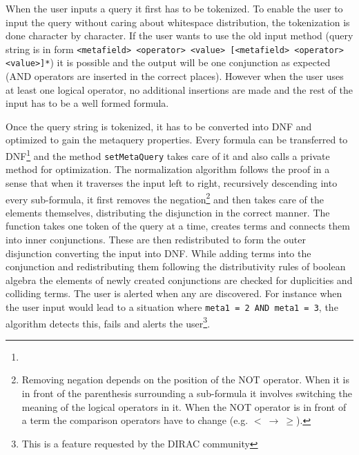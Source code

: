 
When the user inputs a query it first has to be tokenized. To enable the user to input the query without caring 
about whitespace distribution, the tokenization is done character by character.
If the user wants to use the old input method (query string is in form 
\texttt{<metafield> <operator> <value> [<metafield> <operator> <value>]*})
it is possible and the output will be one conjunction as expected (AND operators are inserted in the
correct places). However when the user uses at least one logical operator, no additional insertions are made
and the rest of the input has to be a well formed formula. 

Once the query string is tokenized, it has to be converted into DNF and optimized to gain the metaquery 
properties. Every formula can be transferred to DNF\footnote{} and %
the method \texttt{setMetaQuery} takes care of it and also calls a private method for optimization.
The normalization algorithm follows the proof in a sense that when it traverses the input left to right, 
recursively descending into every sub-formula, it first removes the negation\footnote{Removing negation depends on 
the position of the NOT operator. When it is in front of the parenthesis surrounding a sub-formula it involves 
switching the meaning of the logical operators in it. When the NOT operator is in front of a term the comparison 
operators have to change (e.g. $ < \: \rightarrow \: \geq$).} 
and then takes care of the elements themselves, distributing the disjunction in the correct manner. %
The function takes one token of the query at a time, creates terms and connects them into inner conjunctions. 
These are then redistributed to form the outer disjunction converting the input into DNF. 
While adding terms into the conjunction and redistributing them following the distributivity rules of boolean algebra 
the elements of newly created conjunctions are checked for duplicities and colliding terms. The user is alerted 
when any are discovered. For instance when the user input would lead to a situation where 
\texttt{meta1 = 2 AND meta1 = 3}, the algorithm detects this, fails and alerts the 
user\footnote{This is a feature requested by the DIRAC community}. 


